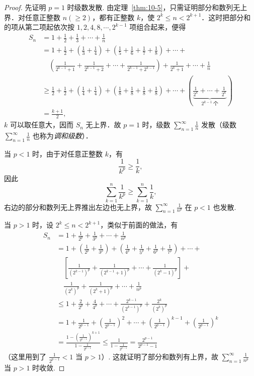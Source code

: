 \begin{proof}
先证明 $p=1$ 时级数发散. 由定理~\ref{thm:10-5}，只需证明部分和数列无上界．对任意正整数 $n(\geqslant2)$，都有正整数 $k$，使 $2^k\leqslant n<2^{k+1}$．这时把部分和的项从第二项起依次按 $1,2,4,8,\cdots,2^{k-1}$ 项组合起来，便得
\[
\begin{aligned}
S_{n}&=1+\frac{1}{2}+\frac{1}{3}+\cdots+\frac{1}{n}\\
&=1+\frac{1}{2}+\left(\frac{1}{3}+\frac{1}{4}\right)+\left(\frac{1}{5}+\frac{1}{6}+\frac{1}{7}+\frac{1}{8}\right)+\cdots+\\
&\quad\left(\frac{1}{2^{k-1}+1}+\frac{1}{2^{k-1}+2}+\cdots+\frac{1}{2^{k-1}+2^{k-1}}\right)+\frac{1}{2^{k}+1}+\cdots+\frac{1}{n}\\
&\geqslant\frac{1}{2}+\frac{1}{2}+\left(\frac{1}{4}+\frac{1}{4}\right)+\left(\frac{1}{8}+\frac{1}{8}+\frac{1}{8}+\frac{1}{8}\right)+\cdots+\left(\underbrace{\frac{1}{2^{k}}+\cdots+\frac{1}{2^{k}}}_{2^{k-1}\ \text{个}}\right)\\
&=\frac{k+1}{2},
\end{aligned}
\]
$k$ 可以取任意大，因而 $S_{n}$ 无上界．故 $p=1$ 时，级数 $\sum_{n=1}^{\infty}\frac{1}{n}$ 发散（级数 $\sum_{n=1}^{\infty}\frac{1}{n}$ 也称为\emph{调和级数}）．

当 $p<1$ 时，由于对任意正整数 $k$，有
\[
\frac{1}{k^{p}}\geqslant\frac{1}{k},
\]
因此
\[
\sum_{k=1}^{n}\frac{1}{k^{p}}\geq\sum_{k=1}^{n}\frac{1}{k},
\]
右边的部分和数列无上界推出左边也无上界，故 $\sum_{n=1}^{\infty}\frac{1}{n^{p}}$ 在 $p<1$ 也发散.

当 $p>1$ 时，设 $2^{k}\leqslant n<2^{k+1}$，类似于前面的做法，有
\[
\begin{aligned}
S_{n}&=1+\frac{1}{2^{p}}+\frac{1}{3^{p}}+\cdots+\frac{1}{n^{p}}\\
&=1+\left(\frac{1}{2^{p}}+\frac{1}{3^{p}}\right)+\left(\frac{1}{4^{p}}+\frac{1}{5^{p}}+\frac{1}{6^{p}}+\frac{1}{7^{p}}\right)+\cdots+\\
&\quad\left[\frac{1}{(2^{k-1})^{p}}+\frac{1}{(2^{k-1}+1)^{p}}+\cdots+\frac{1}{(2^{k}-1)^{p}}\right]+\\
&\quad\frac{1}{(2^{k})^{p}}+\frac{1}{(2^{k}+1)^{p}}+\cdots+\frac{1}{n^{p}}\\
&\leqslant1+\frac{2}{2^{p}}+\frac{4}{4^{p}}+\cdots+\frac{2^{k-1}}{(2^{k-1})^{p}}+\frac{2^{k}}{(2^{k})^{p}}\\
&=1+\frac{1}{2^{p-1}}+\left(\frac{1}{2^{p-1}}\right)^{2}+\cdots+\left(\frac{1}{2^{p-1}}\right)^{k-1}+\left(\frac{1}{2^{p-1}}\right)^{k}\\
&=\frac{1-\left(\frac{1}{2^{p-1}}\right)^{k+1}}{1-\frac{1}{2^{p-1}}}\leqslant\frac{1}{1-\frac{1}{2^{p-1}}}=\frac{2^{p-1}}{2^{p-1}-1}
\end{aligned}
\]
（这里用到了 $\frac{1}{2^{p-1}}<1$ 当 $p>1$）. 这就证明了部分和数列有上界，故 $\sum_{n=1}^{\infty}\frac{1}{n^{p}}$ 当 $p>1$ 时收敛.
\end{proof}


